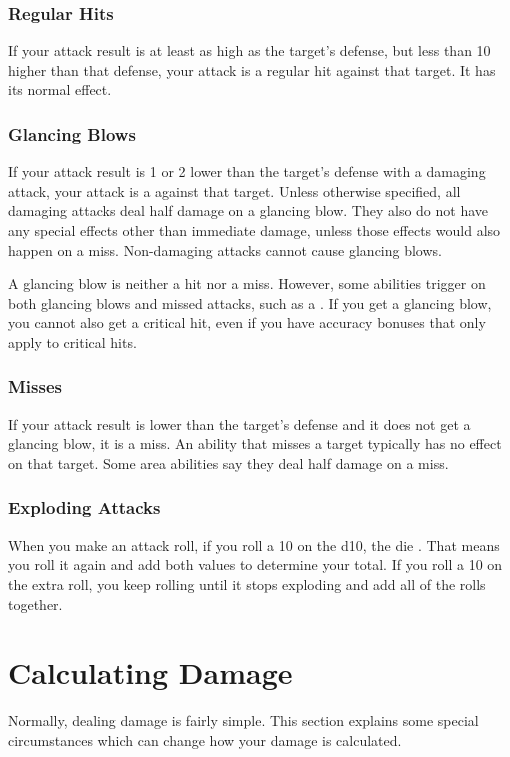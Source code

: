     \subsubsection{Regular Hits}
      If your attack result is at least as high as the target's defense, but less than 10 higher than that defense, your attack is a regular hit against that target.
      It has its normal effect.

    \subsubsection{Glancing Blows}\label{Glancing Blows}
      If your attack result is 1 or 2 lower than the target's defense with a damaging attack, your attack is a  against that target.
      Unless otherwise specified, all damaging attacks deal half damage on a glancing blow.
      They also do not have any special effects other than immediate damage, unless those effects would also happen on a miss.
      Non-damaging attacks cannot cause glancing blows.

      A glancing blow is neither a hit nor a miss.
      However, some abilities trigger on both glancing blows and missed attacks, such as a .
      If you get a glancing blow, you cannot also get a critical hit, even if you have accuracy bonuses that only apply to critical hits.

    \subsubsection{Misses}
      If your attack result is lower than the target's defense and it does not get a glancing blow, it is a miss.
      An ability that misses a target typically has no effect on that target.
      Some area abilities say they deal half damage on a miss.

    \subsubsection{Exploding Attacks}\label{Exploding Attacks}
      When you make an attack roll, if you roll a 10 on the d10, the die .
      That means you roll it again and add both values to determine your total.
      If you roll a 10 on the extra roll, you keep rolling until it stops exploding and add all of the rolls together.

\section{Calculating Damage}
  Normally, dealing damage is fairly simple.
  This section explains some special circumstances which can change how your damage is calculated.

